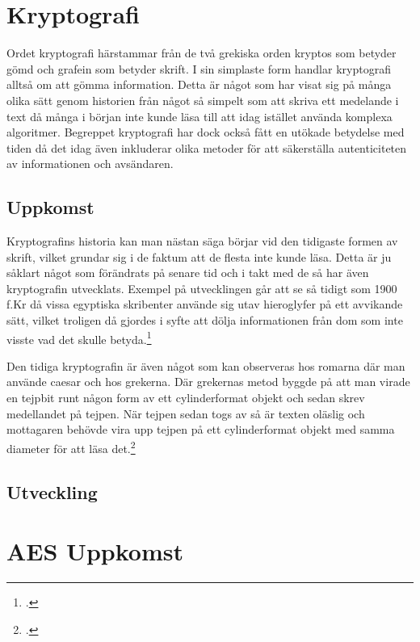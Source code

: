 
\section{Kryptografi} %
Ordet kryptografi härstammar från de två grekiska orden
kryptos som betyder gömd och grafein som betyder skrift.
I sin simplaste form handlar kryptografi alltså om att
gömma information. Detta är något som har visat sig på många
olika sätt genom historien från något så simpelt som att skriva
ett medelande i text då många i början inte kunde läsa till
att idag istället använda komplexa algoritmer.
Begreppet kryptografi har dock också fått en utökade betydelse
med tiden då det idag även inkluderar olika metoder för att
säkerställa autenticiteten av informationen och avsändaren.

\subsection{Uppkomst} %
Kryptografins historia kan man nästan säga börjar vid den
tidigaste formen av skrift, vilket grundar sig i de faktum att
de flesta inte kunde läsa. Detta är ju såklart något som förändrats
på senare tid och i takt med de så har även kryptografin utvecklats.
Exempel på utvecklingen går att se så tidigt som 1900 f.Kr då vissa egyptiska
skribenter använde sig utav hieroglyfer på ett avvikande sätt, vilket
troligen då gjordes i syfte att dölja informationen från dom som inte
visste vad det skulle betyda.\footcite{kryptografi-historia-1}

Den tidiga kryptografin är även något som kan observeras hos romarna där
man använde \gls{caesar} och hos grekerna. Där grekernas metod byggde på
att man virade en tejpbit runt någon form av ett cylinderformat objekt
och sedan skrev medellandet på tejpen. När tejpen sedan togs av så är texten %
oläslig och mottagaren behövde vira upp tejpen på ett cylinderformat objekt
med samma diameter för att läsa det.\footcite{kryptografi-historia-1}

\subsection{Utveckling} %

\section{AES Uppkomst} %

